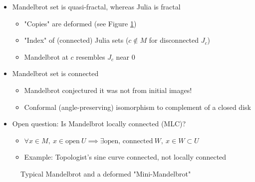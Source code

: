 \documentclass{article}
\begin{document}
\begin{itemize}
    \item Mandelbrot set is quasi-fractal, whereas Julia is fractal
    \begin{itemize}
        \item "Copies" are deformed (see Figure \ref{fig:MandelbrotSet})
        \item "Index" of (connected) Julia sets ($c \not \in M$ for disconnected $J_c$)
        \item Mandelbrot at $c$ resembles $J_c$ near $0$
    \end{itemize}

    \item Mandelbrot set is connected
    \begin{itemize}
        \item Mandelbrot conjectured it was not from initial images!
        \item Conformal (angle-preserving) isomorphism to complement of a closed disk
    \end{itemize}

    \item Open question: Is Mandelbrot locally connected (MLC)?
    \begin{itemize}
        \item $\forall x \in M,\ x \in \textrm{open}\ U  \implies \exists \text{open, connected}\ W,\ x \in W \subset U$
        \item Example: Topologist's sine curve connected, not locally connected
    \end{itemize}
\end{itemize}


\begin{figure}[!htbp]
    \centering
    \caption{Typical Mandelbrot \cite{NormalMandelbrot} and a deformed "Mini-Mandelbrot" \cite{MiniMandelbrot}} %
    \label{fig:MandelbrotSet}%
\end{figure}%
\end{document}
